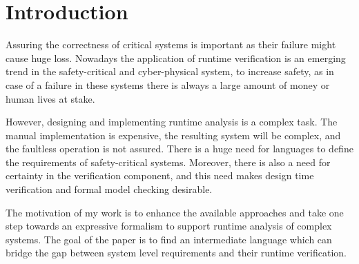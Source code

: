 \chapter{Introduction}
\label{chap:intro}

Assuring the correctness of critical systems is important as their failure might cause huge loss.
Nowadays the application of runtime verification is an emerging trend in the safety-critical and cyber-physical system, to increase safety, as in case of a failure in these systems there is always a large amount of money or human lives at stake. 

However, designing and implementing runtime analysis is a complex task. The manual implementation is expensive, the resulting system will be complex, and the faultless operation is not assured.
There is a huge need for languages to define the requirements of safety-critical systems.
Moreover, there is also a need for certainty in the verification component, and this need makes design time verification and formal model checking desirable. 

The motivation of my work is to enhance the available approaches and take one step towards an expressive formalism to support runtime analysis of complex systems.
The goal of the paper is to find an intermediate language which can bridge the gap between system level requirements and their runtime verification.


